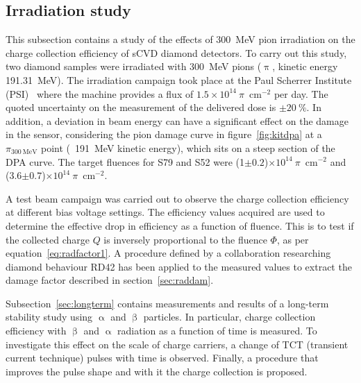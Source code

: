 \subsection{Irradiation study}
This subsection contains a study of the effects of 300~MeV pion irradiation on the charge collection efficiency of sCVD diamond detectors. To carry out this study, two diamond samples were irradiated with 300~MeV pions ($\uppi$, kinetic energy 191.31~MeV). The irradiation campaign took place at the Paul Scherrer Institute (PSI)~\cite{PSI:00000} where the machine provides a flux of $1.5\times10^{14}~\pi$~cm$^{-2}$ per day. The quoted uncertainty on the measurement of the delivered dose is $\pm20~\%$. In addition, a deviation in beam energy can have a significant effect on the damage in the sensor, considering the pion damage curve in figure~\ref{fig:kitdpa} at a $\pi_{\mathrm{300~MeV}}$ point (~191~MeV kinetic energy), which sits on a steep section of the DPA curve. The target fluences for S79 and S52 were  (1$\pm0.2$)$\times10^{14}~\pi$~cm$^{-2}$ and (3.6$\pm0.7$)$\times10^{14}~\pi$~cm$^{-2}$.

A test beam campaign was carried out to observe the charge collection efficiency at different bias voltage settings. The efficiency values acquired are used to determine the effective drop in efficiency as a function of fluence. This is to test if the collected charge $Q$ is inversely proportional to the fluence $\Phi$, as per equation~\ref{eq:radfactor1}. A procedure defined by a collaboration researching diamond behaviour RD42 has been applied to the measured values to extract the damage factor described in section~\ref{sec:raddam}.

Subsection~\ref{sec:longterm} contains measurements and results of a long-term stability study using $\upalpha$ and $\upbeta$ particles. In particular, charge collection efficiency with $\upbeta$ and $\upalpha$ radiation as a function of time is measured. To investigate this effect on the scale of charge carriers, a change of TCT (transient current technique) pulses with time is observed. Finally, a procedure that improves the pulse shape and with it the charge collection is proposed.





